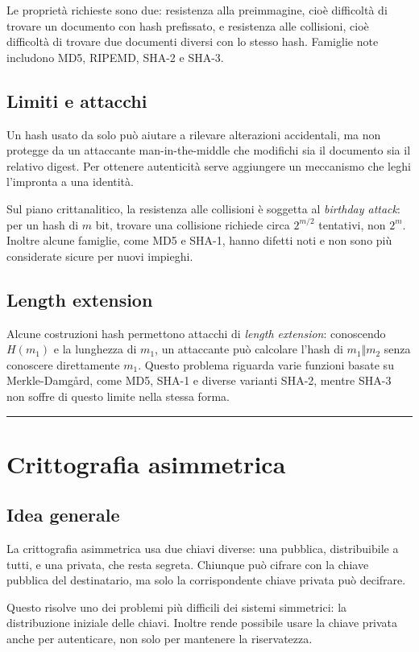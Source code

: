 \documentclass[12pt, a4paper]{report}
\begin{document}
Le proprietà richieste sono due: resistenza alla preimmagine, cioè difficoltà di trovare un documento con hash prefissato, e resistenza alle collisioni, cioè difficoltà di trovare due documenti diversi con lo stesso hash. Famiglie note includono MD5, RIPEMD, SHA-2 e SHA-3.

\subsection{Limiti e attacchi}
Un hash usato da solo può aiutare a rilevare alterazioni accidentali, ma non protegge da un attaccante man-in-the-middle che modifichi sia il documento sia il relativo digest. Per ottenere autenticità serve aggiungere un meccanismo che leghi l'impronta a una identità.

Sul piano crittanalitico, la resistenza alle collisioni è soggetta al \textit{birthday attack}: per un hash di $m$ bit, trovare una collisione richiede circa $2^{m/2}$ tentativi, non $2^m$. Inoltre alcune famiglie, come MD5 e SHA-1, hanno difetti noti e non sono più considerate sicure per nuovi impieghi.

\subsection{Length extension}
Alcune costruzioni hash permettono attacchi di \textit{length extension}: conoscendo $H(m_1)$ e la lunghezza di $m_1$, un attaccante può calcolare l'hash di $m_1 \Vert m_2$ senza conoscere direttamente $m_1$. Questo problema riguarda varie funzioni basate su Merkle-Damgård, come MD5, SHA-1 e diverse varianti SHA-2, mentre SHA-3 non soffre di questo limite nella stessa forma.

\noindent\rule{\textwidth}{0.4pt}

\section{Crittografia asimmetrica}

\subsection{Idea generale}
La crittografia asimmetrica usa due chiavi diverse: una pubblica, distribuibile a tutti, e una privata, che resta segreta. Chiunque può cifrare con la chiave pubblica del destinatario, ma solo la corrispondente chiave privata può decifrare.

Questo risolve uno dei problemi più difficili dei sistemi simmetrici: la distribuzione iniziale delle chiavi. Inoltre rende possibile usare la chiave privata anche per autenticare, non solo per mantenere la riservatezza.
\end{document}

